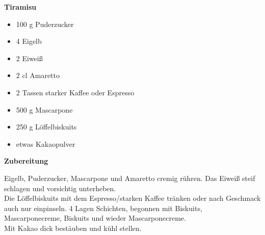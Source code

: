 
\parindent0pt	

\pagestyle{empty}


\textbf{{\LARGE Tiramisu}}%


\hrulefill
\vspace*{\fill}
\begin{multicols}{2}	


\begin{itemize}
\item 100 g 	Puderzucker
\item 4  	Eigelb
\item 2  	Eiweiß
\item 2 cl 	Amaretto
\item 2 Tassen starker Kaffee oder Espresso
\item 500 g 	Mascarpone
\item 250 g 	Löffelbiskuits
\item  etwas 	Kakaopulver 
\end{itemize}

\end{multicols}
\vfill
\newpage
\textbf{{\LARGE Zubereitung}}%

\hrulefill

\vspace*{\fill}
\begin{multicols}{2}



Eigelb, Puderzucker, Mascarpone und Amaretto cremig rühren. 
Das Eiweiß steif schlagen und vorsichtig unterheben.\\
 
Die Löffelbiskuits mit dem Espresso/starken Kaffee tränken oder nach Geschmack auch nur einpinseln.
4 Lagen Schichten, begonnen mit Biskuits, Mascarponecreme, Biskuits und wieder Mascarponecreme.\\
 
Mit Kakao dick bestäuben und kühl stellen. 



\end{multicols}
\vfill
